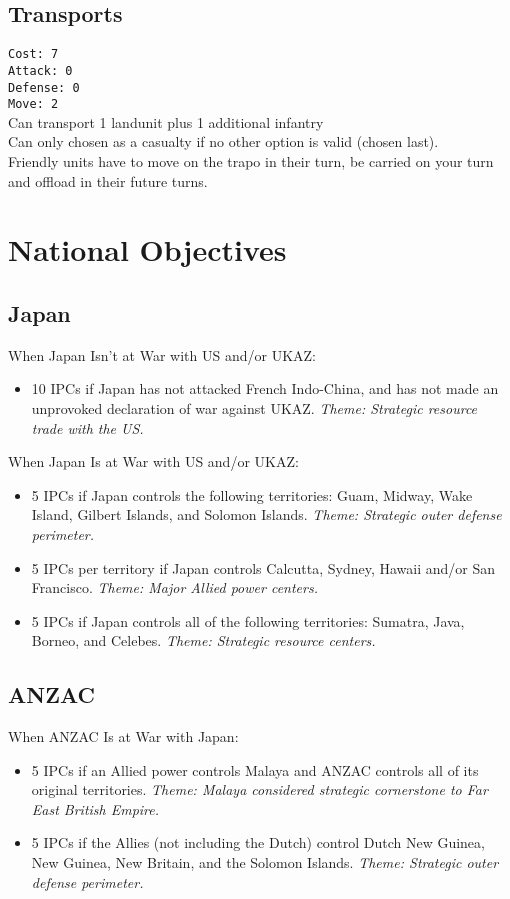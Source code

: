 \documentclass[10pt,a4paper,landscape]{article}
\begin{document}
\begin{multicols*}{3}
\subsection*{Transports}
\texttt{Cost: 7 \\ Attack: 0 \\ Defense: 0 \\ Move: 2}
\\
Can transport 1 landunit plus 1 additional infantry\\
Can only chosen as a casualty if no other option is valid (\glqq chosen last\grqq).\\
Friendly units have to move on the trapo in their turn, be carried on your turn and offload in their future turns.

\noindent\begin{minipage}{\linewidth}
\section*{National Objectives}
\subsection*{Japan}
When Japan Isn't at War with US and/or UKAZ:
\begin{itemize}
\item 10 IPCs if Japan has not attacked French Indo-China, and has not made an unprovoked declaration of war against UKAZ. \textsl{Theme: Strategic resource trade with the US.}
\end{itemize}
When Japan Is at War with US and/or UKAZ:
\begin{itemize}
\item 5 IPCs if Japan controls the following territories: Guam, Midway, Wake Island, Gilbert Islands, and Solomon Islands. \textsl{Theme: Strategic outer defense perimeter.}
\item 5 IPCs per territory if Japan controls Calcutta, Sydney, Hawaii and/or San Francisco. \textsl{Theme: Major Allied power centers.}
\item 5 IPCs if Japan controls all of the following territories: Sumatra, Java, Borneo, and Celebes. \textsl{Theme: Strategic resource centers.}
\end{itemize}

\subsection*{ANZAC}
When ANZAC Is at War with Japan:
\begin{itemize}
\item 5 IPCs if an Allied power controls Malaya and ANZAC controls all of its original territories. \textsl{Theme: Malaya considered strategic cornerstone to Far East British Empire.}
\item 5 IPCs if the Allies (not including the Dutch) control Dutch New Guinea, New Guinea, New Britain, and the Solomon Islands. \textsl{Theme: Strategic outer defense perimeter.}
\end{itemize}
\end{minipage}
\columnbreak

\end{multicols*}
\end{document}
